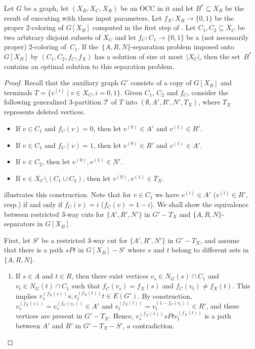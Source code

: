 \begin{lemma}
	\label{lem:marked:separators:for:all:ARN}
	Let $G$ be a graph, let $(X_B, X_C, X_R)$ be an OCC in it and let $B^\ast \subseteq X_B$ be the result of executing  with these input parameters. Let $f_X : X_B \rightarrow \{0, 1\}$ be the proper $2$-coloring of $G[X_B]$ computed in the first step of . Let $C_1, C_2 \subseteq X_C$ be two arbitrary disjoint subsets of $X_C$ and let $f_C: C_1 \rightarrow \{0, 1\}$ be a (not necessarily proper) $2$-coloring of~$C_1$. If the~$\{A,R,N\}$-separation problem imposed onto~$G[X_B]$ by $(C_1, C_2, f_C, f_X)$ has a solution of size at most~$|X_C|$, then the set~$B^\ast$ contains an optimal solution to this separation problem.
\end{lemma}
\begin{proof}
	Recall that the auxiliary graph $G'$ consists of a copy of $G[X_B]$ and terminals
	$T = \{v^{(i)} \mid v \in X_C, i=0,1\}$.
	Given $C_1$, $C_2$ and $f_C$, consider the following generalized $3$-partition $\mathcal{T}$ of $T$
	into $(\emptyset, A',R',N',T_X)$, where $T_X$ represents deleted vertices.
	\begin{itemize}
		\item If $v \in C_1$ and $f_C(v)=0$, then let $v^{(0)} \in A'$ and $v^{(1)} \in R'$.
		\item If $v \in C_1$ and $f_C(v)=1$, then let $v^{(0)} \in R'$ and $v^{(1)} \in A'$.
		\item If $v \in C_2$, then let $v^{(0)},v^{(1)} \in N'$.
		\item If $v \in X_C \setminus (C_1 \cup C_2)$, then let $v^{(0)},v^{(1)} \in T_X$.
	\end{itemize}
	 illustrates this construction.
	Note that for $v \in C_1$ we have $v^{(i)} \in A'$ ($v^{(i)} \in R'$, resp.)
	if and only if $f_C(v)=i$ ($f_C(v)=1-i$).
	We shall show the equivalence between restricted 3-way cuts for $\{A',R',N'\}$ in $G'-T_X$
	and $\{A,R,N\}$-separators in $G[X_B]$.
	
	First, let $S'$ be a restricted 3-way cut for $\{A',R',N'\}$ in $G'-T_X$, and
	assume that there is a path $sPt$ in $G[X_B]-S'$ where $s$ and $t$ belong to different sets in $\{A,R,N\}$.
	\begin{enumerate}[(1)]
		\item If $s \in A$ and $t \in R$,
		then there exist vertices $v_s \in N_G(s) \cap C_1$ and $v_t \in N_G(t) \cap C_1$
		such that $f_C(v_s)=f_X(s)$ and $f_C(v_t)\neq f_X(t)$.
		This implies $v_s^{(f_X(s))}s, v_t^{(f_X(t))}t \in E(G')$.
		By construction, $v_s^{(f_X(s))}=v_s^{(f_C(v_s))} \in A'$ and $v_t^{(f_X(t))}=v_t^{(1-f_C(v_t))} \in R'$,
		and these vertices are present in $G'-T_X$.
		Hence, $v_s^{(f_X(s))} s P t v_t^{(f_X(t))}$ is a path between $A'$ and $R'$ in $G'-T_X-S'$, a contradiction.
		

\end{enumerate}
\end{proof}
